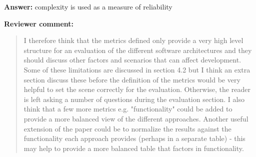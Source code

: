 \documentclass[a4]{article}
\newenvironment{review}%
{\textbf{Reviewer comment:}\begin{quote}}%
{\end{quote}}%
\newcommand{\answer}[1]{\textbf{Answer:} #1}
\begin{document}
\answer{complexity is used as a measure of reliability}

\begin{review}
I therefore think that the metrics defined only provide a very high level structure for an evaluation of the different software architectures and they should discuss other factors and scenarios that can affect development. Some of these limitations are discussed in section 4.2 but I think an extra section discuss these before the definition of the metrics would be very helpful to set the scene correctly for the evaluation. Otherwise, the reader is left asking a number of questions during the evaluation section. I also think that a few more metrics e.g. "functionality" could be added to provide a more balanced view of the different approaches. Another useful extension of the paper could be to normalize the results against the functionality each approach provides (perhaps in a separate table) - this may help to provide a more balanced table that factors in functionality.
\end{review}
\end{document}
